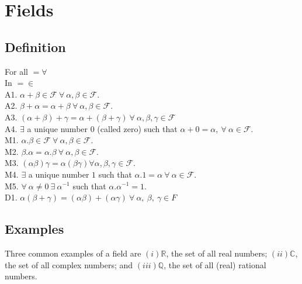 \chapter{Fields}
\section{Definition}
For all $= \forall$ \\
In $= \in$ \\
A1. $	\alpha + \beta  \in \mathcal{F} \ \forall \ \alpha, \beta \in \mathcal{F}.$ \\ 
A2. $\beta + \alpha = \alpha + \beta \ \forall \ \alpha, \beta \in \mathcal{F}.$ \\
A3. $(\alpha + \beta) + \gamma = \alpha + (\beta + \gamma) \ \forall \ \alpha, \beta,\gamma \in \mathcal{F}$ \\
A4. $\exists$ a unique number $0$ (called zero) such that $\alpha + 0 = \alpha, \ \forall \ \alpha \in \mathcal{F}.$ \\
M1. $\alpha . \beta \in \mathcal{F} \ \forall \ \alpha, \beta \in \mathcal{F}.$ \\
M2. $\beta . \alpha = \alpha . \beta \ \forall \ \alpha, \beta \in \mathcal{F}.$ \\
M3. $(\alpha \beta) \gamma = \alpha(\beta \gamma) \forall \alpha, \beta, \gamma \in \mathcal{F}$. \\
M4. $\exists$ a unique number $1$ such that $\alpha.1 = \alpha \ \forall \ \alpha \in \mathcal{F}.$ \\
M5. $\forall \ \alpha \neq 0 \ \exists \ \alpha^{-1}$ such that $\alpha . \alpha^{-1} = 1.$ \\
D1. $\alpha(\beta + \gamma) = (\alpha \beta) + (\alpha \gamma) \ \forall \ \alpha, \ \beta, \ \gamma \in F$
\section{Examples}
Three common examples of a field are $(i) \mathbb{R}$, the set of all real numbers;
$(ii) \mathbb{C}$, the set of all complex numbers; and $(iii) \mathbb{Q}$, the set of all (real) rational
numbers.